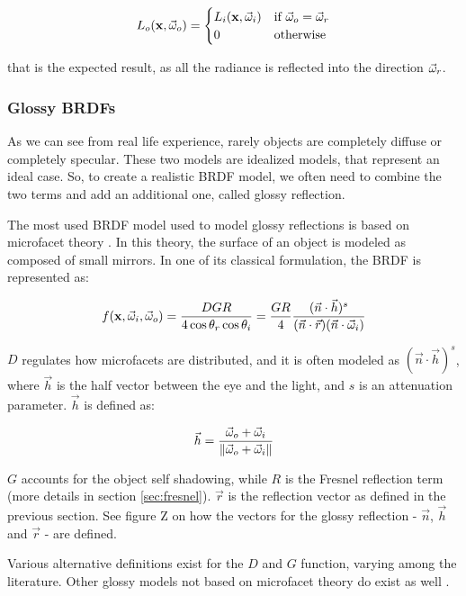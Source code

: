 \begin{equation*}
L_o(\mathbf{x}, \vec{\omega}_o) = \begin{cases}
L_i(\mathbf{x}, \vec{\omega}_i)  &\text{if $\vec{\omega}_o = \vec{\omega}_r$}\\
0 &\text{otherwise}
\end{cases}
\end{equation*}

that is the expected result, as all the radiance is reflected into the direction $\vec{\omega}_r$.

\subsubsection{Glossy BRDFs}

As we can see from real life experience, rarely objects are completely diffuse or completely specular. These two models are idealized models, that represent an ideal case. So, to create a realistic BRDF model, we often need to combine the two terms and add an additional one, called glossy reflection.

The most used BRDF model used to model glossy reflections is based on microfacet theory \citep{Ashikmin:2000:MBG:344779.344814}. In this theory, the surface of an object is modeled as composed of small mirrors. In one of its classical formulation, the BRDF is represented as:

$$
f(\mathbf{x}, \vec{\omega}_i, \vec{\omega}_o) = \frac{D G R}{4 \cos\theta_r \cos\theta_i} = \frac{G R}{4} \frac{(\vec{n}\cdot\vec{h})^s}{(\vec{n}\cdot\vec{r})(\vec{n}\cdot\vec{\omega}_i)}
$$

$D$ regulates how microfacets are distributed, and it is often modeled as $(\vec{n}\cdot\vec{h})^s$, where $\vec{h}$ is the half vector between the eye and the light, and $s$ is an attenuation parameter. $\vec{h}$ is defined as:

$$
\vec{h} = \frac{\vec{\omega}_o + \vec{\omega}_i}{\left\| \vec{\omega}_o + \vec{\omega}_i \right\|}
$$

$G$ accounts for the object self shadowing, while $R$ is the Fresnel reflection term (more details in section \ref{sec:fresnel}).	$\vec{r}$ is the reflection vector as defined in the previous section. See figure Z on how the vectors for the glossy reflection - $\vec{n}$, $\vec{h}$ and $\vec{r}$ - are defined.

Various alternative definitions exist for the $D$ and $G$ function, varying among the literature. Other glossy models not based on microfacet theory do exist as well \citep{montes2012overview}. 

